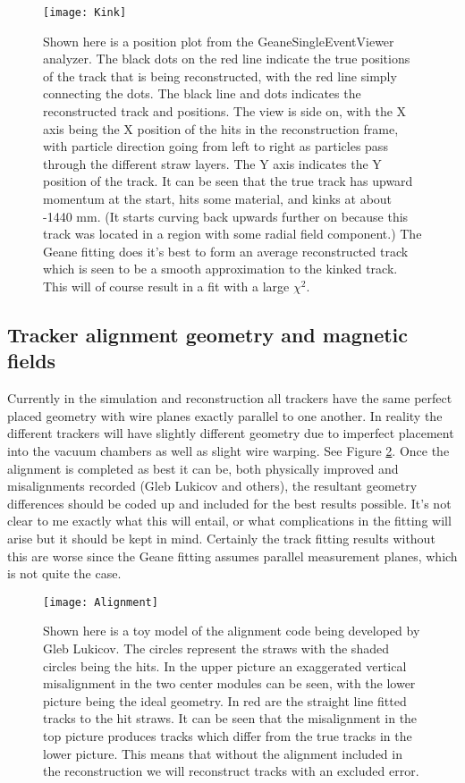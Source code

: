 			\begin{figure}[]
				\caption{Shown here is a position plot from the GeaneSingleEventViewer analyzer. The black dots on the red line indicate the true positions of the track that is being reconstructed, with the red line simply connecting the dots. The black line and dots indicates the reconstructed track and positions. The view is side on, with the X axis being the X position of the hits in the reconstruction frame, with particle direction going from left to right as particles pass through the different straw layers. The Y axis indicates the Y position of the track. It can be seen that the true track has upward momentum at the start, hits some material, and kinks at about -1440 mm. (It starts curving back upwards further on because this track was located in a region with some radial field component.) The Geane fitting does it's best to form an average reconstructed track which is seen to be a smooth approximation to the kinked track. This will of course result in a fit with a large $\chi^{2}$.}
				\centering
				\texttt{[image: Kink]}
				\label{fig:Kink}
			\end{figure}

	\subsection{Tracker alignment geometry and magnetic fields}

		Currently in the simulation and reconstruction all trackers have the same perfect placed geometry with wire planes exactly parallel to one another. In reality the different trackers will have slightly different geometry due to imperfect placement into the vacuum chambers as well as slight wire warping. See Figure \ref{fig:Alignment}. Once the alignment is completed as best it can be, both physically improved and misalignments recorded (Gleb Lukicov and others), the resultant geometry differences should be coded up and included for the best results possible. It's not clear to me exactly what this will entail, or what complications in the fitting will arise but it should be kept in mind. Certainly the track fitting results without this are worse since the Geane fitting assumes parallel measurement planes, which is not quite the case.

			\begin{figure}[]
				\caption{Shown here is a toy model of the alignment code being developed by Gleb Lukicov. The circles represent the straws with the shaded circles being the hits. In the upper picture an exaggerated vertical misalignment in the two center modules can be seen, with the lower picture being the ideal geometry. In red are the straight line fitted tracks to the hit straws. It can be seen that the misalignment in the top picture produces tracks which differ from the true tracks in the lower picture. This means that without the alignment included in the reconstruction we will reconstruct tracks with an excluded error.}
				\centering
				\texttt{[image: Alignment]}
				\label{fig:Alignment}
			\end{figure}

